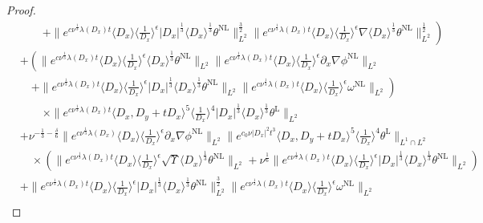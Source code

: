 \documentclass[reqno, 12pt]{amsart} %
\theoremstyle{plain} %
\theoremstyle{definition}
\theoremstyle{remark}
\numberwithin{equation}{section} %
\newcommand{\lt}{\left}
\newcommand{\rt}{\right}
\begin{document}
\begin{proof}
{\begin{align*}
				&\lt. \qquad + \|e^{c \nu^{\frac{1}{3}} \lambda\left(D_x\right) t}\langle D_x\rangle\langle\frac{1}{D_x}\rangle^\epsilon\left|D_x\right|^{\frac{1}{3}}  \langle D_x \rangle^\frac13  \theta^{\mathrm{NL}}\|_{L^2}^{\frac{3}{2}}   \|e^{c \nu^{\frac{1}{3}} \lambda\left(D_x\right) t}\langle D_x\rangle\langle\frac{1}{D_x}\rangle^\epsilon \nabla \langle D_x \rangle^\frac13  \theta^{\mathrm{NL}}\|_{L^2}^{\frac{1}{2}}\right)\\
				&+ \lt( \|e^{c \nu^{\frac{1}{3}} \lambda\left(D_x\right) t}\langle D_x\rangle  \langle\frac{1}{D_x}\rangle^\epsilon \langle D_x \rangle^\frac13  \theta^{\mathrm{NL}}\|_{L^2}\|e^{c \nu^{\frac{1}{3}} \lambda\left(D_x\right) t}\langle D_x\rangle \langle\frac{1}{D_x}\rangle^\epsilon \partial_x \nabla \phi^{\mathrm{NL}}\|_{L^2} \rt. \\
				&\lt. \quad + \|e^{c \nu^{\frac{1}{3}} \lambda\left(D_x\right) t}\langle D_x\rangle    \langle\frac{1}{D_x}\rangle^\epsilon    \left|D_x\right|^{\frac{1}{3}} \langle D_x \rangle^\frac13  \theta^{\mathrm{NL}}\|_{L^2}\|e^{c \nu^{\frac{1}{3}} \lambda\left(D_x\right) t}\langle D_x\rangle\langle\frac{1}{D_x}\rangle^\epsilon \omega^{\mathrm{NL}}\|_{L^2} \rt) \\
				& \qquad \times\|e^{c \nu^{\frac{1}{3}} \lambda\left(D_x\right) t}\langle D_x, D_y+t D_x\rangle^5\langle\frac{1}{D_x}\rangle^4\left|D_x\right|^{\frac{1}{3}} \langle D_x \rangle^\frac13  \theta^{\mathrm{L}}\|_{L^2} \\
				&  + \nu^{-\frac{1}{3}-\frac{\delta}{6}}\|e^{c \nu^{\frac{1}{3}} \lambda\left(D_x\right)}\langle D_x\rangle\langle\frac{1}{D_x}\rangle^\epsilon \partial_x \nabla \phi^{\mathrm{NL}}\|_{L^2}\|e^{c_0 \nu\left|D_x\right|^2 t^3}\langle D_x, D_y+t D_x\rangle^5\langle\frac{1}{D_x}\rangle^4 \theta^{\mathrm{L}}\|_{L^1 \cap L^2} \\
				&\quad  \times\left(\|e^{c \nu^{\frac{1}{3}} \lambda\left(D_x\right) t}\langle D_x\rangle\langle\frac{1}{D_x}\rangle^\epsilon \sqrt{\Upsilon} \langle D_x \rangle^\frac13  \theta^{\mathrm{NL}}\|_{L^2}+\nu^{\frac{1}{6}}\|e^{c \nu^{\frac{1}{3}} \lambda\left(D_x\right) t}\langle D_x\rangle\langle\frac{1}{D_x}\rangle^\epsilon |D_x|^\frac13 \langle D_x \rangle^{\frac{1}{3}} \theta^{\mathrm{NL}}\|_{L^2}\right) \\
				&+\|e^{c \nu^{\frac{1}{3}} \lambda\left(D_x\right) t}\langle D_x\rangle    \langle \frac{1}{D_x}\rangle^\epsilon  \left|D_x\right|^{\frac{1}{3}}\langle D_x \rangle^\frac13 \theta^{\mathrm{NL}}\|_{L^2}^\frac32 \|e^{c \nu^{\frac{1}{3}} \lambda\left(D_x\right) t}\langle D_x\rangle\langle\frac{1}{D_x}\rangle^\epsilon \omega^{\mathrm{NL}}\|_{L^2} \\

\end{align*}}
\end{proof}
\end{document}
